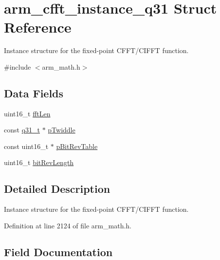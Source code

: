 \hypertarget{structarm__cfft__instance__q31}{}\section{arm\+\_\+cfft\+\_\+instance\+\_\+q31 Struct Reference}
\label{structarm__cfft__instance__q31}


Instance structure for the fixed-\/point C\+F\+F\+T/\+C\+I\+F\+FT function.  




{\ttfamily \#include $<$arm\+\_\+math.\+h$>$}

\subsection*{Data Fields}
\begin{DoxyCompactItemize}
\item 
uint16\+\_\+t \hyperlink{structarm__cfft__instance__q31_ab8db3bbe7c61e6bb8ca2a55e3446e11a}{fft\+Len}
\item 
const \hyperlink{arm__math_8h_adc89a3547f5324b7b3b95adec3806bc0}{q31\+\_\+t} $\ast$ \hyperlink{structarm__cfft__instance__q31_a9760c603af5d85652496dbffd63a8a2e}{p\+Twiddle}
\item 
const uint16\+\_\+t $\ast$ \hyperlink{structarm__cfft__instance__q31_a3b229432d381b0a511a9cdbe3aa74e78}{p\+Bit\+Rev\+Table}
\item 
uint16\+\_\+t \hyperlink{structarm__cfft__instance__q31_a65e1b3e327b8fab9404287ed8f347cc8}{bit\+Rev\+Length}
\end{DoxyCompactItemize}


\subsection{Detailed Description}
Instance structure for the fixed-\/point C\+F\+F\+T/\+C\+I\+F\+FT function. 

Definition at line 2124 of file arm\+\_\+math.\+h.



\subsection{Field Documentation}
